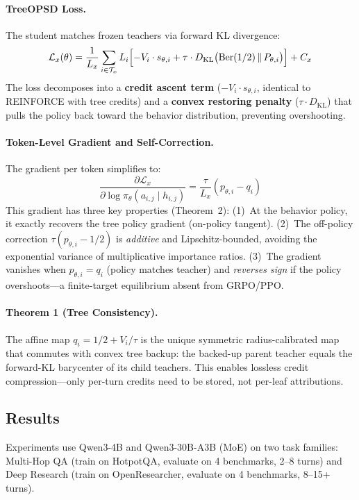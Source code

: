 \documentclass[11pt,a4paper]{article}
\begin{document}
\paragraph{TreeOPSD Loss.}
The student matches frozen teachers via forward KL divergence:
\begin{equation}
\mathcal{L}_x(\theta) = \frac{1}{L_x} \sum_{i \in \mathcal{T}_x} L_i \Bigl[-V_i \cdot s_{\theta,i} + \tau \cdot D_{\text{KL}}\bigl(\text{Ber}(1/2) \,\|\, P_{\theta,i}\bigr)\Bigr] + C_x
\end{equation}
The loss decomposes into a \textbf{credit ascent term} ($-V_i \cdot s_{\theta,i}$, identical to REINFORCE with tree credits) and a \textbf{convex restoring penalty} ($\tau \cdot D_{\text{KL}}$) that pulls the policy back toward the behavior distribution, preventing overshooting.

\paragraph{Token-Level Gradient and Self-Correction.}
The gradient per token simplifies to:
\begin{equation}
\frac{\partial \mathcal{L}_x}{\partial \log \pi_\theta(a_{i,j} \mid h_{i,j})} = \frac{\tau}{L_x} (p_{\theta,i} - q_i)
\end{equation}
This gradient has three key properties (Theorem~2): (1)~At the behavior policy, it exactly recovers the tree policy gradient (on-policy tangent). (2)~The off-policy correction $\tau(p_{\theta,i} - 1/2)$ is \emph{additive} and Lipschitz-bounded, avoiding the exponential variance of multiplicative importance ratios. (3)~The gradient vanishes when $p_{\theta,i} = q_i$ (policy matches teacher) and \emph{reverses sign} if the policy overshoots---a finite-target equilibrium absent from GRPO/PPO.

\paragraph{Theorem 1 (Tree Consistency).}
The affine map $q_i = 1/2 + V_i/\tau$ is the unique symmetric radius-calibrated map that commutes with convex tree backup: the backed-up parent teacher equals the forward-KL barycenter of its child teachers. This enables lossless credit compression---only per-turn credits need to be stored, not per-leaf attributions.

\subsection{Results}
Experiments use Qwen3-4B and Qwen3-30B-A3B (MoE) on two task families: Multi-Hop QA (train on HotpotQA, evaluate on 4 benchmarks, 2--8 turns) and Deep Research (train on OpenResearcher, evaluate on 4 benchmarks, 8--15+ turns).
\end{document}
